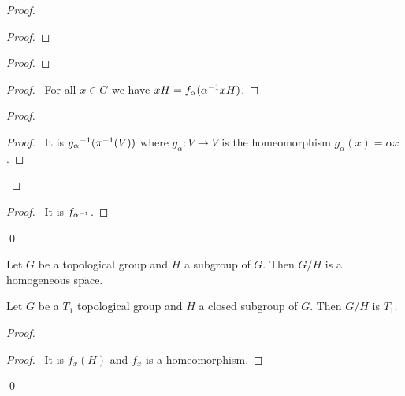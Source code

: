 \begin{proof}
\pf
{}
\begin{proof}
\end{proof}
\begin{proof}
\end{proof}
\begin{proof}
	\pf\ For all $x \in G$ we have $xH = f_\alpha({\alpha}^{-1} x H)$.
\end{proof}
\begin{proof}
	\begin{proof}
		\pf\ It is ${g_\alpha}^{-1}({\pi}^{-1}(V))$ where $g_\alpha : V \rightarrow V$ is the homeomorphism $g_\alpha(x) = \alpha x$.
	\end{proof}
\end{proof}
\begin{proof}
	\pf\ It is $f_{{\alpha}^{-1}}$.
\end{proof}
\qed
\end{proof}

\begin{cor}
Let $G$ be a topological group and $H$ a subgroup of $G$. Then $G/H$ is a homogeneous space.
\end{cor}

\begin{prop}
Let $G$ be a $T_1$ topological group and $H$ a closed subgroup of $G$. Then $G/H$ is $T_1$.
\end{prop}

\begin{proof}
\pf
{}
\begin{proof}
	\pf\ It is $f_x(H)$ and $f_x$ is a homeomorphism.
\end{proof}
\qed
\end{proof}

